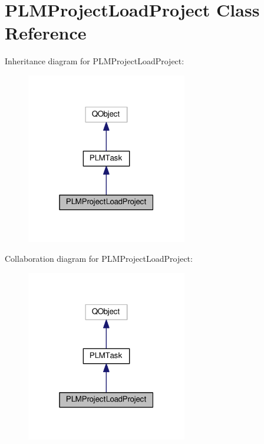 \hypertarget{class_p_l_m_project_load_project}{}\section{P\+L\+M\+Project\+Load\+Project Class Reference}
\label{class_p_l_m_project_load_project}


Inheritance diagram for P\+L\+M\+Project\+Load\+Project\+:\nopagebreak
\begin{figure}[H]
\begin{center}
\leavevmode
\includegraphics[width=199pt]{class_p_l_m_project_load_project__inherit__graph}
\end{center}
\end{figure}


Collaboration diagram for P\+L\+M\+Project\+Load\+Project\+:\nopagebreak
\begin{figure}[H]
\begin{center}
\leavevmode
\includegraphics[width=199pt]{class_p_l_m_project_load_project__coll__graph}
\end{center}
\end{figure}
